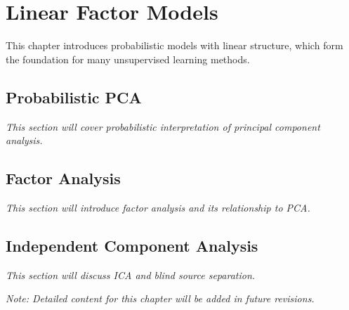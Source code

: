 
\chapter{Linear Factor Models}
\label{chap:linear-factor-models}

This chapter introduces probabilistic models with linear structure, which form the foundation for many unsupervised learning methods.

\section{Probabilistic PCA}

\textit{This section will cover probabilistic interpretation of principal component analysis.}

\section{Factor Analysis}

\textit{This section will introduce factor analysis and its relationship to PCA.}

\section{Independent Component Analysis}

\textit{This section will discuss ICA and blind source separation.}

\vspace{1em}
\noindent\textit{Note: Detailed content for this chapter will be added in future revisions.}

